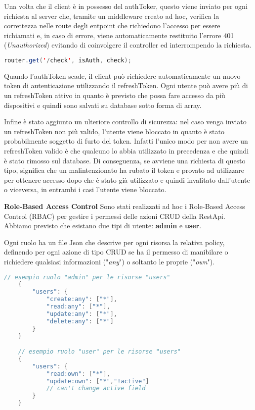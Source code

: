 Una volta che il client è in possesso del authToker, questo viene inviato per ogni richiesta al server che, 
tramite un middleware creato ad hoc, verifica la correttezza nelle route degli entpoint che richiedono l'accesso per essere richiamati e,
in caso di errore, viene automaticamente restituito l'errore 401 (\textit{Unauthorized}) evitando di coinvolgere il controller ed interrompendo la richiesta.

\begin{lstlisting}[language=java]
	router.get('/check', isAuth, check);
\end{lstlisting}

Quando l'authToken scade, il client può richiedere automaticamente un nuovo token di autenticazione utilizzando il refreshToken.
Ogni utente può avere più di un refreshToken attivo in quanto è previsto che possa fare accesso da più dispositivi e quindi sono salvati su database sotto forma di array.

Infine è stato aggiunto un ulteriore controllo di sicurezza: nel caso venga inviato un refreshToken non più valido, 
l'utente viene bloccato in quanto è stato probabilmente soggetto di furto del token. 
Infatti l'unico modo per non avere un refreshToken valido è che qualcuno lo abbia utilizzato in precedenza e che quindi è stato rimosso sul database.
Di conseguenza, se avviene una richiesta di questo tipo, significa che un malintenzionato ha rubato il token 
e provato ad utilizzare per ottenere accesso dopo che è stato già utilizzato e quindi invalitato dall'utente o viceversa, 
in entrambi i casi l'utente viene bloccato.

\bigbreak
\noindent
\textbf{Role-Based Access Control}
\bigbreak
\noindent
Sono stati realizzati ad hoc i Role-Based Access Control (RBAC) per gestire i permessi delle azioni CRUD della RestApi.
Abbiamo previsto che esistano due tipi di utente: \textbf{admin} e \textbf{user}.

Ogni ruolo ha un file Json che descrive per ogni risorsa la relativa policy, 
definendo per ogni azione di tipo CRUD se ha il permesso 
di manibilare o richiedere qualsiasi informazioni ("\textit{any}") o soltanto le proprie ("\textit{own}").

\begin{lstlisting}[language=java]
	// esempio ruolo "admin" per le risorse "users"
	{
		"users": { 
			"create:any": ["*"],
			"read:any": ["*"],
			"update:any": ["*"],
			"delete:any": ["*"]
		}
	}

	// esempio ruolo "user" per le risorse "users"
	{
		"users": {
			"read:own": ["*"],
			"update:own": ["*","!active"] 
			// can't change active field
		}
	}
\end{lstlisting}

